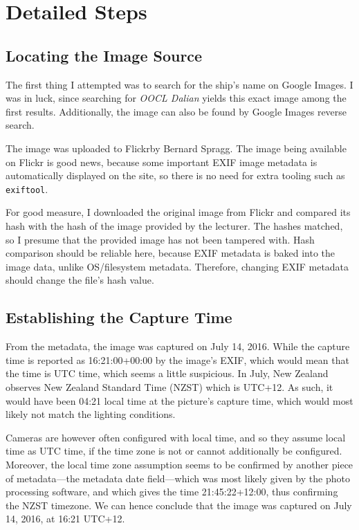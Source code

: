 \documentclass[parskip=half]{scrartcl}
\begin{document}
\section{Detailed Steps}

\subsection{Locating the Image Source}

The first thing I attempted was to search for the ship's name on Google Images.
I was in luck, since searching for \textit{OOCL Dalian} yields this exact image
among the first results. Additionally, the image can also be found by Google
Images reverse search.

The image was uploaded to Flickr\footnotemark by Bernard Spragg. The image being
available on Flickr is good news, because some important EXIF image metadata is
automatically displayed on the site, so there is no need for extra tooling such
as \texttt{exiftool}.

For good measure, I downloaded the original image from Flickr and compared its
hash with the hash of the image provided by the lecturer. The hashes matched, so
I presume that the provided image has not been tampered with. Hash comparison
should be reliable here, because EXIF metadata is baked into the image data,
unlike OS/filesystem metadata. Therefore, changing EXIF metadata should change
the file's hash value.

\subsection{Establishing the Capture Time}

From the metadata, the image was captured on July 14, 2016. While the capture
time is reported as 16:21:00+00:00 by the image's EXIF, which would mean that
the time is UTC time, which seems a little suspicious. In July, New Zealand
observes New Zealand Standard Time (NZST) which is UTC+12. As such, it would
have been 04:21 local time at the picture's capture time, which would most
likely not match the lighting conditions.

Cameras are however often configured with local time, and so they assume local
time as UTC time, if the time zone is not or cannot additionally be configured.
Moreover, the local time zone assumption seems to be confirmed by another piece
of metadata---the metadata date field---which was most likely given by the
photo processing software, and which gives the time 21:45:22+12:00, thus
confirming the NZST timezone. We can hence conclude that the image was captured
on July 14, 2016, at 16:21 UTC+12.
\end{document}
